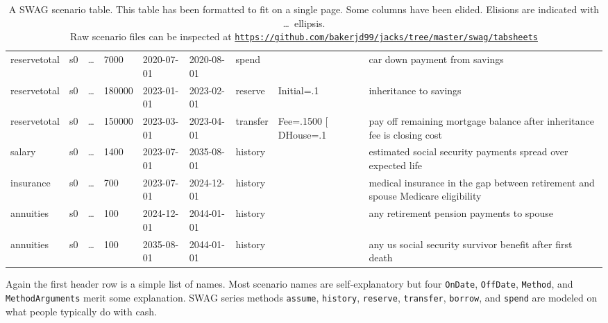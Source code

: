 \begin{sidewaystable}
\begin{tabular}{llllllllp{1.5in}}
reservetotal &s0 &\ldots &7000   &2020-07-01 &2020-08-01 &spend    &                                                               &car down payment from savings \\                                                  
reservetotal &s0 &\ldots &180000 &2023-01-01 &2023-02-01 &reserve  &Initial=.1                                                     &inheritance to savings \\                                                         
reservetotal &s0 &\ldots &150000 &2023-03-01 &2023-04-01 &transfer &Fee=.1500 [ DHouse=.1                                         &pay off remaining mortgage balance after inheritance fee is closing cost \\       
salary       &s0 &\ldots &1400   &2023-07-01 &2035-08-01 &history  &                                                               &estimated social security payments spread over expected life  \\                  
insurance    &s0 &\ldots &700    &2023-07-01 &2024-12-01 &history  &                                                               &medical insurance in the gap between retirement and spouse Medicare eligibility \\
annuities    &s0 &\ldots &100    &2024-12-01 &2044-01-01 &history  &                                                               &any retirement pension payments to spouse \\                                       
annuities    &s0 &\ldots &100    &2035-08-01 &2044-01-01 &history  &                                                               &any us social security survivor benefit after first death \\ \hline
\end{tabular}
\normalsize
\caption{A SWAG scenario table. This table has been formatted to fit on a single page. Some columns 
have been elided. Elisions are indicated with \ldots\ ellipsis.
\vspace{5pt}
\\
Raw scenario files can be inspected at \href{https://github.com/bakerjd99/jacks/tree/master/swag/tabsheets}{\texttt{https://github.com/bakerjd99/jacks/tree/master/swag/tabsheets}}}
\end{sidewaystable}


Again the first header row is a simple list of names. Most scenario
names are self-explanatory but four \texttt{OnDate}, \texttt{OffDate},
\texttt{Method}, and \texttt{MethodArguments} merit some explanation.
SWAG series methods \texttt{assume}, \texttt{history}, \texttt{reserve},
\texttt{transfer}, \texttt{borrow}, and \texttt{spend} are modeled on
what people typically do with cash.

